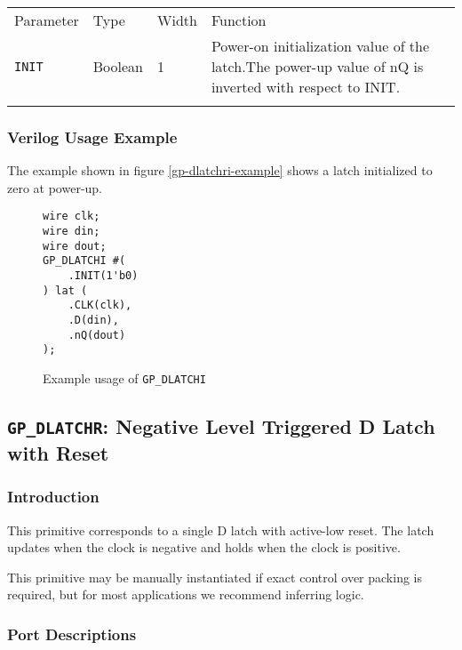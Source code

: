 \documentclass[11pt]{article}
\newcommand{\tokenstyle}[1]{\texttt{#1}}
\newcommand{\whenstyle}[1]{{\fontseries{sb}\selectfont#1}}
\newcommand{\thinhline}{\Xhline{1\arrayrulewidth}}
\newcommand{\thickhline}{\Xhline{2.5\arrayrulewidth}}
\begin{document}
\begin{tabularx}{\textwidth}{lllX}
\thinhline
\whenstyle{Parameter} & \whenstyle{Type} & \whenstyle{Width} & \whenstyle{Function} \\
\thickhline
\tokenstyle{INIT} & Boolean & 1 & Power-on initialization value of the latch.\newline The power-up value of nQ is
inverted with respect to INIT.\\
\thinhline
\end{tabularx}

\subsubsection{Verilog Usage Example}

The example shown in figure \ref{gp-dlatchri-example} shows a latch initialized to zero at power-up.

\begin{figure}[h]
\begin{lstlisting}
wire clk;
wire din;
wire dout;
GP_DLATCHI #(
	.INIT(1'b0)
) lat (
	.CLK(clk),
	.D(din),
	.nQ(dout)
);
\end{lstlisting}
\caption{Example usage of \tokenstyle{GP\_DLATCHI}}
\label{gp-dlatchi-example}
\end{figure}


\pagebreak
\subsection{\tokenstyle{GP\_DLATCHR}: Negative Level Triggered D Latch with Reset}
\label{gp-latchr}

\subsubsection{Introduction}
This primitive corresponds to a single D latch with active-low reset. The latch updates when the clock is negative and holds 
when the clock is positive.

This primitive may be manually instantiated if exact control over packing is required, but for most applications we
recommend inferring logic.

\subsubsection{Port Descriptions}
\end{document}

